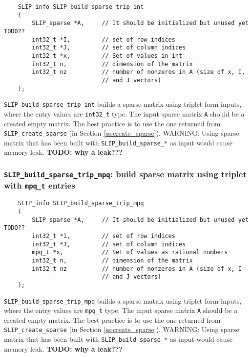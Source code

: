 \documentclass[12pt]{article}
\theoremstyle{definition}
\begin{document}
\begin{mdframed}[userdefinedwidth=6in]
{\footnotesize
\begin{verbatim}
    SLIP_info SLIP_build_sparse_trip_int
    (
        SLIP_sparse *A,     // It should be initialized but unused yet TODO??
        int32_t *I,         // set of row indices
        int32_t *J,         // set of column indices
        int32_t *x,         // Set of values in int
        int32_t n,          // dimension of the matrix
        int32_t nz          // number of nonzeros in A (size of x, I,
                            // and J vectors)
    );
\end{verbatim}
} \end{mdframed}

\verb|SLIP_build_sparse_trip_int| builds a sparse matrix using triplet form
inputs, where the entry values are \verb|int32_t| type. The input sparse matrix
\verb|A| should be a created empty matrix. The best practice is to use
the one returned from \verb|SLIP_create_sparse| (in Section
\ref{ss:create_sparse}). WARNING: Using sparse matrix that has been built with
\verb|SLIP_build_sparse_*| as input would cause memory leak.
{\bf TODO: why a leak???} %

\cprotect\subsubsection{\verb|SLIP_build_sparse_trip_mpq|: build sparse matrix using triplet with \verb|mpq_t| entries}
\label{s:user:build_sparse_trip_mpq}

\begin{mdframed}[userdefinedwidth=6in]
{\footnotesize
\begin{verbatim}
    SLIP_info SLIP_build_sparse_trip_mpq
    (
        SLIP_sparse *A,     // It should be initialized but unused yet TODO??
        int32_t *I,         // set of row indices
        int32_t *J,         // set of column indices
        mpq_t *x,           // Set of values as rational numbers
        int32_t n,          // dimension of the matrix
        int32_t nz          // number of nonzeros in A (size of x, I
                            // and J vectors)
    );
\end{verbatim}
} \end{mdframed}

\verb|SLIP_build_sparse_trip_mpq| builds a sparse matrix using triplet form
inputs, where the entry values are \verb|mpq_t| type. The input sparse matrix
\verb|A| should be a created empty matrix. The best practice is to use
the one returned from \verb|SLIP_create_sparse| (in Section
\ref{ss:create_sparse}). WARNING: Using sparse matrix that has been built with
\verb|SLIP_build_sparse_*| as input would cause memory leak.
{\bf TODO: why a leak???} %
\end{document}
